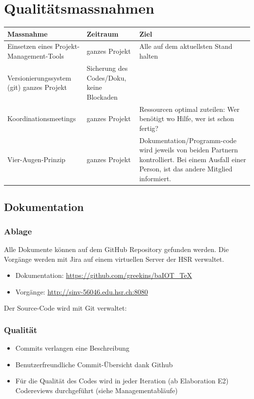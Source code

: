 \section*{Qualitätsmassnahmen}

\begin{tabularx}{\textwidth}{XXX}
	\textbf{Massnahme}	& \textbf{Zeitraum} & \textbf{Ziel} \\ \hline
	Einsetzen eines Projekt-Management-Tools & ganzes Projekt & Alle auf dem aktuellsten Stand halten \\ \hline
	Versionierungssystem (git) ganzes Projekt & Sicherung des Codes/Doku, keine Blockaden \\ \hline
	Koordinationsmeetings & ganzes Projekt & Ressourcen optimal zuteilen: Wer benötigt wo Hilfe, wer ist schon fertig? \\ \hline
	Vier-Augen-Prinzip & ganzes Projekt & Dokumentation/Programm-code wird jeweils von beiden Partnern kontrolliert. Bei einem Ausfall einer Person, ist das andere Mitglied informiert. \\ \hline
\end{tabularx}

\subsection*{Dokumentation}
\subsubsection*{Ablage}
Alle Dokumente können auf dem GitHub Repository gefunden werden. Die Vorgänge werden mit Jira auf einem virtuellen Server der HSR verwaltet.
\begin{itemize}
	\item Dokumentation: \url{https://github.com/greekins/baIOT_TeX} 
	\item Vorgänge: \url{http://sinv-56046.edu.hsr.ch:8080}
\end{itemize}
Der Source-Code wird mit Git verwaltet: \tbd

\subsubsection*{Qualität}
\begin{itemize}
	\item Commits verlangen eine Beschreibung
	\item Benutzerfreundliche Commit-Übersicht dank Github
	\item Für die Qualität des Codes wird in jeder Iteration (ab Elaboration E2) Codereviews durchgeführt (siehe Managementabläufe)
\end{itemize}

